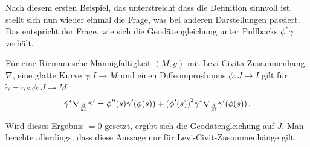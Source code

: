 \documentclass[../H_Analysis_main.tex]{subfiles}
\begin{document}
\iffalse
\begin{figure}
\centering

\texttt{[image: Bilder/vectorfield\_example\_circle.pdf]}

\caption{Tangentialvektorfeld am Kreisbogen}
\label{fig:keine_geodaete}
\end{figure}
\fi


Nach diesem ersten Beispiel, das unterstreicht dass die Definition sinnvoll ist, stellt sich nun wieder einmal die Frage, was bei anderen Darstellungen passiert. Das entspricht der Frage, wie sich die Geodätengleichung unter Pullbacks $\phi^* \gamma$ verhält.

\begin{lemma}
Für eine Riemannsche Mannigfaltigkeit $(M, g)$ mit Levi-Civita-Zusammenhang $\nabla$, eine glatte Kurve $\gamma: I \rightarrow M$ und einen Diffeomproshimus $\phi: J \rightarrow I$ gilt für $\tilde{\gamma} = \gamma \circ \phi: J \rightarrow M$:
\begin{equation}
\tilde{\gamma}^* \nabla_{\dv{s}} \tilde{\gamma}' = \phi''(s) \gamma'\qty(\phi(s)) + \qty(\phi'(s))^2 \gamma^* \nabla_{\dv{t}} \gamma'\qty(\phi(s)) \, .
\end{equation}
\end{lemma}
Wird dieses Ergebnis $= 0$ gesetzt, ergibt sich die Geodätengleichung auf $J$. Man beachte allerdings, dass diese Aussage nur für Levi-Civit-Zusammenhänge gilt.\\
\end{document}
